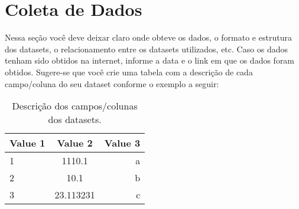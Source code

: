 \chapter{Coleta de Dados}
 
Nessa seção você deve deixar claro onde obteve os dados, o formato e estrutura dos datasets, o relacionamento entre os datasets utilizados, etc. Caso os dados tenham sido obtidos na internet, informe a data e o link em que os dados foram obtidos. Sugere-se que você crie uma tabela com a descrição de cada campo/coluna do seu dataset conforme o exemplo a seguir: 

\begin{table}[h!]
  \begin{center}
    \caption{Descrição dos campos/colunas dos datasets.}
    \label{tab:table1}
    \begin{tabular}{|l|c|r|} %
      \hline
       \textbf{Value 1} & \textbf{Value 2} & \textbf{Value 3}\\
      \hline
      1 & 1110.1 & a\\
      \hline
      2 & 10.1 & b\\
      \hline
      3 & 23.113231 & c\\
      \hline
    \end{tabular}
  \end{center}
\end{table}